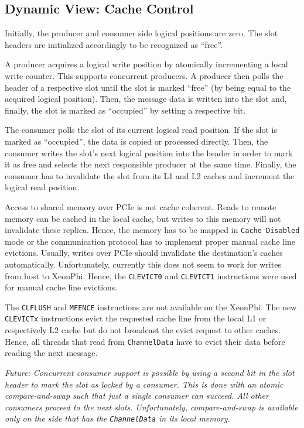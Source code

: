 \subsection{Dynamic View: Cache Control}

Initially, the producer and consumer side logical positions are zero. The slot
headers are initialized accordingly to be recognized as ``free''.

A producer acquires a logical write position by atomically incrementing a local
write counter. This supports concurrent producers. A producer then polls the
header of a respective slot until the slot is marked ``free'' (by being equal to
the acquired logical position). Then, the message data is written into the slot
and, finally, the slot is marked as ``occupied'' by setting a respective bit.

The consumer polls the slot of its current logical read position. If the slot is
marked as ``occupied'', the data is copied or processed directly. Then, the
consumer writes the slot's next logical position into the header in order to
mark it as free and selects the next responsible producer at the same time.
Finally, the consumer has to invalidate the slot from its L1 and L2 caches and
increment the logical read position.

Access to shared memory over PCIe is not cache coherent. Reads to remote memory
can be cached in the local cache, but writes to this memory will not invalidate
these replica. Hence, the memory has to be mapped in \texttt{Cache Disabled}
mode or the communication protocol has to implement proper manual cache line
evictions. Usually, writes over PCIe should invalidate the destination's caches
automatically. Unfortunately, currently this does not seem to work for writes
from host to XeonPhi. Hence, the \texttt{CLEVICT0} and \texttt{CLEVICT1}
instructions were used for manual cache line evictions.

The \texttt{CLFLUSH} and \texttt{MFENCE} instructions are not available on the
XeonPhi. The new \texttt{CLEVICTx} instructions evict the requested cache line
from the local L1 or respectively L2 cache but do not broadcast the evict
request to other caches. Hence, all threads that read from \texttt{ChannelData}
have to evict their data before reading the next message.

\emph{Future: Concurrent consumer support is possible by using a second bit in
the slot header to mark the slot as locked by a consumer. This is done with an
atomic compare-and-swap such that just a single consumer can succeed. All other
consumers proceed to the next slots. Unfortunately, compare-and-swap is
available only on the side that has the \texttt{ChannelData} in its local
memory.}

